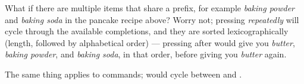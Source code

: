 		What if there are multiple items that share a prefix, for example \emph{baking powder} and \emph{baking soda} in the pancake recipe above? Worry not; pressing  \emph{repeatedly} will cycle through the available completions, and they are sorted lexicographically (length, followed by alphabetical order) --- pressing  after  would give you \emph{butter}, \emph{baking powder}, and \emph{baking soda}, in that order, before giving you \emph{butter} again.

		The same thing applies to commands;  would cycle between  and .










